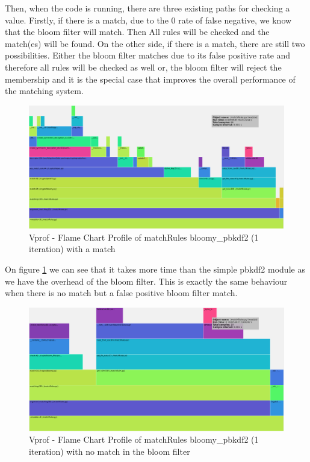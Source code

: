 \documentclass{eplmastersthesis}
\begin{document}
Then, when the code is running, there are three existing paths for checking a value. Firstly, if there is a match, due to the 0 rate of false negative, we know that the bloom filter will match. Then All rules will be checked and the match(es) will be found. On the other side, if there is a match, there are still two possibilities. Either the bloom filter matches due to its false positive rate and therefore all rules will be checked as well or, the bloom filter will reject the membership and it is the special case that improves the overall performance of the matching system.\\


\begin{figure}[h!]
\begin{center}
	\includegraphics[scale=0.3]{res/match-exist}
	\caption{Vprof - Flame Chart Profile of matchRules bloomy\_pbkdf2 (1 iteration) with a match}
	\label{profile-bloomy-match}
\end{center}
\end{figure}

On figure \ref{profile-bloomy-match} we can see that it takes more time than the simple \gls{pbkdf2} module as we have the overhead of the bloom filter. This is exactly the same behaviour when there is no match but a false positive bloom filter match.\\

\begin{figure}[h!]
\begin{center}
	\includegraphics[scale=0.3]{res/match-bloom-not}
	\caption{Vprof - Flame Chart Profile of matchRules bloomy\_pbkdf2 (1 iteration) with no match in the bloom filter}
	\label{profile-bloomy-no-match}
\end{center}
\end{figure}
\end{document}
